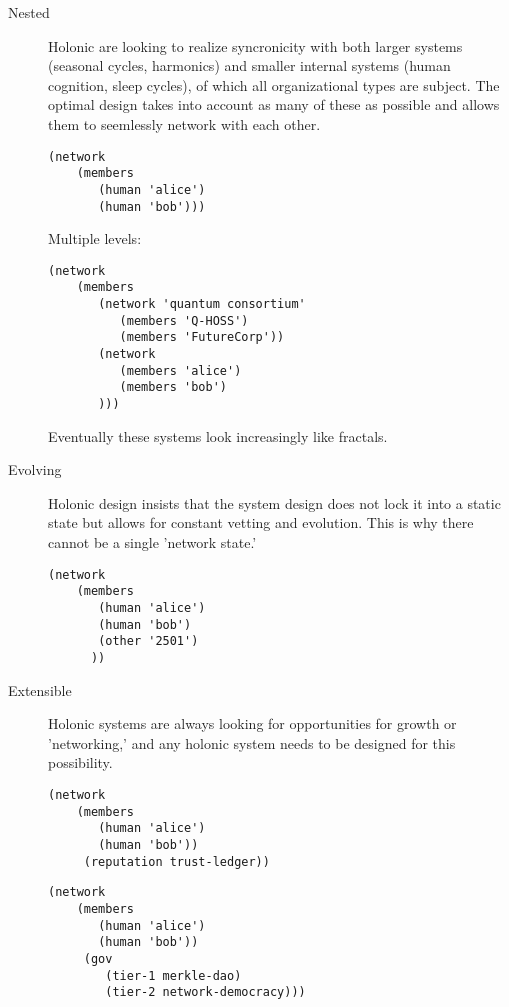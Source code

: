\documentclass{article}
\begin{document}
\begin{description}

\item[Nested]

Holonic are looking to realize syncronicity with both larger systems (seasonal cycles, harmonics) and smaller internal systems (human cognition, sleep cycles), of which all organizational types are subject. The optimal design takes into account as many of these as possible and allows them to seemlessly network with each other.

\begin{lstlisting}
(network
    (members
       (human 'alice')
       (human 'bob')))
\end{lstlisting}


Multiple levels:

\begin{lstlisting}
(network
    (members
       (network 'quantum consortium'
          (members 'Q-HOSS')
          (members 'FutureCorp'))
       (network
          (members 'alice')
          (members 'bob')
       )))
\end{lstlisting}

Eventually these systems look increasingly like fractals.

\item[Evolving]

Holonic design insists that the system design does not lock it into a static state but allows for constant vetting and evolution. This is why there cannot be a single 'network state.'

\begin{lstlisting}
(network
    (members
       (human 'alice')
       (human 'bob')
       (other '2501')
      ))
\end{lstlisting}

\item[Extensible]

Holonic systems are always looking for opportunities for growth or 'networking,' and any holonic system needs to be designed for this possibility.

\begin{lstlisting}
(network
    (members
       (human 'alice')
       (human 'bob'))
     (reputation trust-ledger))
\end{lstlisting}


\begin{lstlisting}
(network
    (members
       (human 'alice')
       (human 'bob'))
     (gov
        (tier-1 merkle-dao)
        (tier-2 network-democracy)))
\end{lstlisting}


\end{description}
\end{document}

